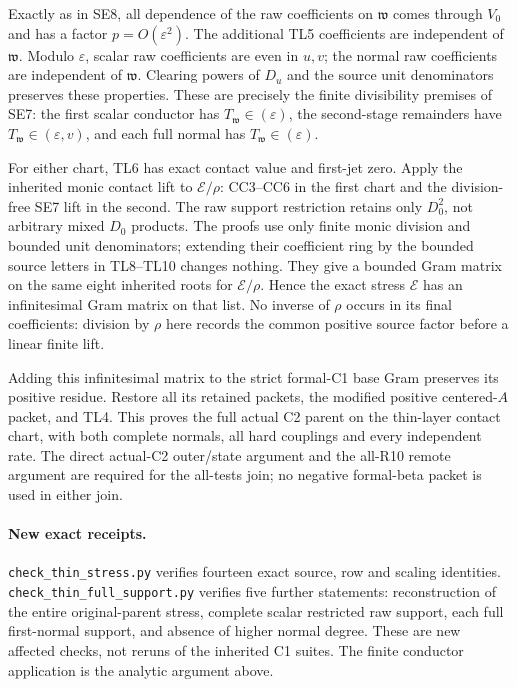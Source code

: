 Exactly as in SE8, all dependence of the raw coefficients on
$\mathfrak w$ comes through $V_0$ and has a factor
$p=O(\varepsilon^2)$. The additional TL5 coefficients are independent
of $\mathfrak w$. Modulo $\varepsilon$, scalar raw coefficients are
even in $u,v$; the normal raw coefficients are independent of
$\mathfrak w$. Clearing powers of $D_u$ and the source unit
denominators preserves these properties. These are precisely the
finite divisibility premises of SE7: the first scalar conductor has
$T_{\mathfrak w}\in(\varepsilon)$, the second-stage remainders have
$T_{\mathfrak w}\in(\varepsilon,v)$, and each full normal has
$T_{\mathfrak w}\in(\varepsilon)$.

For either chart, TL6 has exact contact value and first-jet zero.
Apply the inherited monic contact lift to $\mathscr E/\rho$:
CC3--CC6 in the first chart and the division-free SE7 lift in the
second. The raw support restriction retains only $D_0^2$, not arbitrary
mixed $D_0$ products. The proofs use only finite monic division and
bounded unit denominators; extending their coefficient ring by the
bounded source letters in TL8--TL10 changes nothing. They give a
bounded Gram matrix on the same eight inherited roots for
$\mathscr E/\rho$. Hence the exact stress $\mathscr E$ has an
infinitesimal Gram matrix on that list. No inverse of $\rho$ occurs in
its final coefficients: division by $\rho$ here records the common
positive source factor before a linear finite lift.

Adding this infinitesimal matrix to the strict formal-C1 base Gram
preserves its positive residue. Restore all its retained packets,
the modified positive centered-$A$ packet, and TL4. This proves the
full actual C2 parent on the thin-layer contact chart, with both
complete normals, all hard couplings and every independent rate.
The direct actual-C2 outer/state argument and the all-R10 remote
argument are required for the all-tests join; no negative formal-beta
packet is used in either join.

\paragraph{New exact receipts.}
\texttt{check\_thin\_stress.py} verifies fourteen exact source, row and scaling
identities. \texttt{check\_thin\_full\_support.py} verifies five further
statements: reconstruction of the entire original-parent stress, complete
scalar restricted raw support, each full first-normal support, and absence
of higher normal degree. These are new affected checks, not reruns of the
inherited C1 suites. The finite conductor application is the analytic
argument above.
